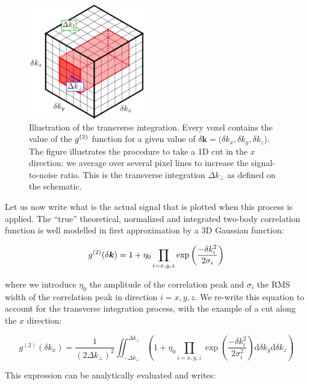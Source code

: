 \begin{figure}
    \centering
    \includegraphics[width=0.45\textwidth]{Fig/Chapter4/cube_integration.png}
    \caption{Illustration of the transverse integration. Every voxel contains the value of the $g^{(2)}$ function for a given value of $\delta \bm{k}=(\delta k_x, \delta k_y, \delta k_z$). The figure illustrates the procedure to take a 1D cut in the $x$ direction: we average over several pixel lines to increase the signal-to-noise ratio. This is the transverse integration $\Delta k_{\perp}$ as defined on the schematic.}
    \label{fig:cube_integration}
\end{figure}

Let us now write what is the actual signal that is plotted when this process is applied. The ``true'' theoretical, normalized and integrated two-body correlation function is well modelled in first approximation by a 3D Gaussian function:

\begin{equation}
    g^{(2)} (\delta \bm{k}) = 1 + \eta_0 \prod_{i=x,y,z} \exp \left(\frac{-\delta k_i^2}{2 \sigma_i}\right)
    \label{eq:g2_theo}
\end{equation}

\noindent where we introduce $\eta_0$ the amplitude of the correlation peak and $\sigma_i$ the RMS width of the correlation peak in direction $i=x,y,z$. We re-write this equation to account for the transverse integration process, with the example of a cut along the $x$ direction:

\begin{equation}
    g^{(2)} \left(\delta k_{x}\right)=\frac{1}{\left(2 \Delta k_{\perp}\right)^{2}} \iint_{-\Delta k_{\perp}}^{\Delta k_{\perp}} \left( 1+ \eta_0 \prod_{i=x, y, z} \exp \left(\frac{-\delta k_{i}^{2}}{2 \sigma_i^{2}}\right) \mathrm{d} \delta k_y \mathrm{d} \delta k_z \right)
\end{equation}

\noindent This expression can be analytically evaluated and writes:

